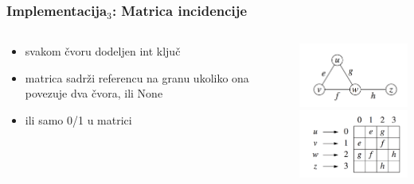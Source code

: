 \documentclass[compress,aspectratio=169]{beamer}
\begin{document}
\begin{frame}[fragile]
  \frametitle{Implementacija$_3$: Matrica incidencije}
  \begin{columns}
    \begin{column}[t]{6cm}
      \begin{itemize}
        \item svakom čvoru dodeljen int ključ
        \item matrica sadrži referencu na granu ukoliko ona povezuje
          dva čvora, ili None
        \item ili samo 0/1 u matrici
      \end{itemize}
    \end{column}
    \begin{column}[t]{6cm}
      \begin{center}
        \includegraphics[width=5cm]{asp-14-pic12.png} \\
        \includegraphics[width=5cm]{asp-14-pic13.png}
      \end{center}
    \end{column}
  \end{columns}
\end{frame}
\end{document}
